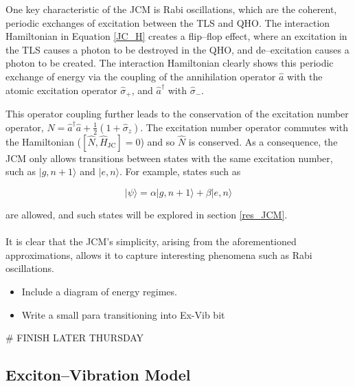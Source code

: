 \documentclass[12pt]{article}
\begin{document}
One key characteristic of the JCM is Rabi oscillations, which are the coherent, periodic exchanges of excitation between the TLS and QHO. The interaction Hamiltonian in Equation \eqref{JC_H} creates a flip--flop effect, where an excitation in the TLS causes a photon to be destroyed in the QHO, and de--excitation causes a photon to be created. The interaction Hamiltonian clearly shows this periodic exchange of energy via the coupling of the annihilation operator $\hat{a}$ with the atomic excitation operator $\hat{\sigma}_+$, and $\hat{a}^\dagger$ with $\hat{\sigma}_-$.

This operator coupling further leads to the conservation of the excitation number operator, $\hat{N} = \hat{a}^\dagger \hat{a} + \frac{1}{2}(1 + \hat{\sigma}_z)$. The excitation number operator commutes with the Hamiltonian ($[\hat{N}, \hat{H}_{\scriptscriptstyle \text{JC}}] = 0$) and so $\hat{N}$ is conserved. As a consequence, the JCM only allows transitions between states with the same excitation number, such as $|g, n+1\rangle$ and $|e,n\rangle$. For example, states such as

\begin{equation} \label{JCM_general_state}
    |\psi\rangle = \alpha|g,n+1\rangle + \beta|e,n\rangle
\end{equation} 

are allowed, and such states will be explored in section \ref{res_JCM}.\\
\\
It is clear that the JCM's simplicity, arising from the aforementioned approximations, allows it to capture interesting phenomena such as Rabi oscillations.


















\begin{itemize}
    \item Include a diagram of energy regimes.
    \item Write a small para transitioning into Ex-Vib bit
\end{itemize}

# FINISH LATER THURSDAY


\subsection{Exciton--Vibration Model}  \label{EVM_Theory}
\end{document}
